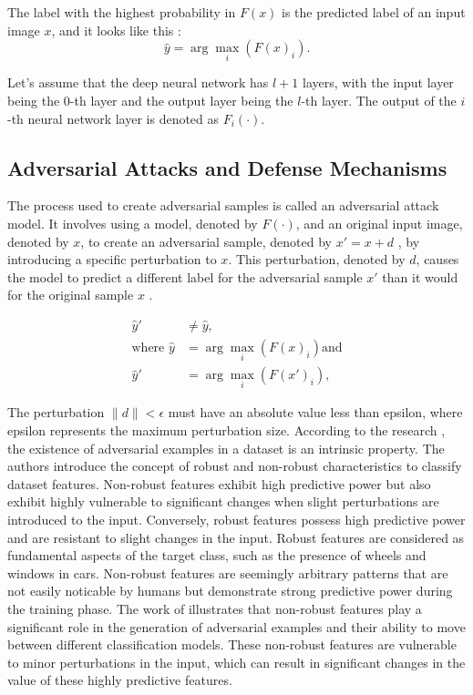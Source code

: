 \documentclass[10pt, conference, a4paper, final]{IEEEtran}
\begin{document}
The label with the highest probability in \( F(x) \) is the predicted label of an input image \( x \), and it looks like this \cite {ZhangS.}: 
\begin{equation}
    \hat{y} = \arg\max_i (F(x)_i).
    \end{equation}

Let's assume that the deep neural network has \( l + 1 \) layers, with the input layer being the 0-th layer and the output layer being the \( l \)-th layer. The output of the \( i \)-th neural network layer is denoted as \( F_i(\cdot) \).

\subsection{Adversarial Attacks and Defense Mechanisms} 

The process used to create adversarial samples is called an adversarial attack model. It involves using a model, denoted by  \( F(\cdot) \), and an original input image, denoted by \( x \), to create an adversarial sample, denoted by \( x' = x + d \) , by introducing a specific perturbation to \( x \). This perturbation, denoted by \( d \), causes the model to predict a different label for the adversarial sample \( x' \) than it would for the original sample \( x \) \cite {ZhangS.}.

\begin{align}
    \hat{y}' &\neq \hat{y}, \\
    \text{where } \hat{y} &= \arg\max_i (F(x)_i) \text{and} \\
    \hat{y}'&= \arg\max_i (F(x')_i),
\end{align}

The perturbation \( \|d\| < \epsilon \) must have an absolute value less than epsilon, where epsilon represents the maximum perturbation size. 
According to the research \cite {Ilyas.}, the existence of adversarial examples in a dataset is an intrinsic property. The authors introduce the concept of robust and non-robust characteristics to classify dataset features. Non-robust features exhibit high predictive power but also exhibit highly vulnerable to significant changes when slight perturbations are introduced to the input. Conversely, robust features possess high predictive power and are resistant to slight changes in the input. Robust features are considered as fundamental aspects of the target class, such as the presence of wheels and windows in cars. Non-robust features are seemingly arbitrary patterns that are not easily noticable by humans but demonstrate strong predictive power during the training phase. The work of \cite {Ilyas.} illustrates that non-robust features play a significant role in the generation of adversarial examples and their ability to move between different classification models. These non-robust features are vulnerable to minor perturbations in the input, which can result in significant changes in the value of these highly predictive features.
\end{document}
